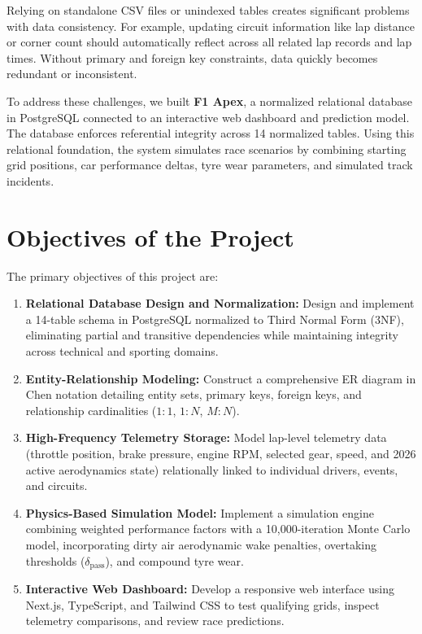 \documentclass[12pt,a4paper]{report}
\begin{document}
Relying on standalone CSV files or unindexed tables creates significant problems with data consistency. For example, updating circuit information like lap distance or corner count should automatically reflect across all related lap records and lap times. Without primary and foreign key constraints, data quickly becomes redundant or inconsistent.

To address these challenges, we built \textbf{F1 Apex}, a normalized relational database in PostgreSQL connected to an interactive web dashboard and prediction model. The database enforces referential integrity across 14 normalized tables. Using this relational foundation, the system simulates race scenarios by combining starting grid positions, car performance deltas, tyre wear parameters, and simulated track incidents.

\section{Objectives of the Project}
The primary objectives of this project are:
\begin{enumerate}
    \item \textbf{Relational Database Design and Normalization:} Design and implement a 14-table schema in PostgreSQL normalized to Third Normal Form (3NF), eliminating partial and transitive dependencies while maintaining integrity across technical and sporting domains.
    \item \textbf{Entity-Relationship Modeling:} Construct a comprehensive ER diagram in Chen notation detailing entity sets, primary keys, foreign keys, and relationship cardinalities ($1:1$, $1:N$, $M:N$).
    \item \textbf{High-Frequency Telemetry Storage:} Model lap-level telemetry data (throttle position, brake pressure, engine RPM, selected gear, speed, and 2026 active aerodynamics state) relationally linked to individual drivers, events, and circuits.
    \item \textbf{Physics-Based Simulation Model:} Implement a simulation engine combining weighted performance factors with a 10,000-iteration Monte Carlo model, incorporating dirty air aerodynamic wake penalties, overtaking thresholds ($\delta_{\text{pass}}$), and compound tyre wear.
    \item \textbf{Interactive Web Dashboard:} Develop a responsive web interface using Next.js, TypeScript, and Tailwind CSS to test qualifying grids, inspect telemetry comparisons, and review race predictions.
\end{enumerate}
\end{document}
